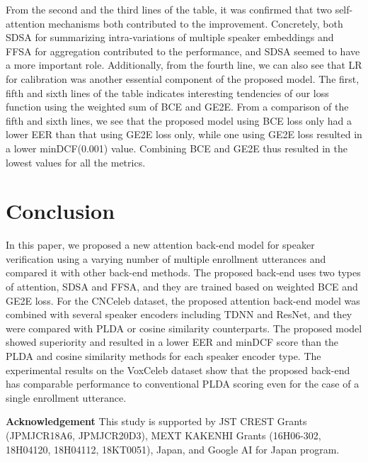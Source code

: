 \documentclass{article}
\begin{document}
From the second and the third lines of the table, it was confirmed that two self-attention mechanisms both contributed to the improvement. Concretely, both SDSA for summarizing intra-variations of multiple speaker embeddings and FFSA for aggregation contributed to the performance, and SDSA seemed to have a more important role. Additionally, from the fourth line, we can also see that LR for calibration was another essential component of the proposed model. 
The first, fifth and sixth lines of the table indicates interesting tendencies of our loss function using the weighted sum of BCE and GE2E. From a comparison of the fifth and sixth lines, we see that the proposed model using BCE loss only had a lower EER than that using GE2E loss only, while one using GE2E loss resulted in a lower minDCF(0.001) value. Combining BCE and GE2E thus resulted in the lowest values for all the metrics. 
\vspace{-1mm}

\section{Conclusion}
\vspace{-1mm}
\label{sec:majhead}

In this paper, we proposed a new attention back-end model for speaker verification using a varying number of multiple enrollment utterances and compared it with other back-end methods. The proposed back-end uses two types of attention, SDSA and FFSA, and they are trained based on weighted BCE and GE2E loss. For the CNCeleb dataset, the proposed attention back-end model was combined with several speaker encoders including TDNN and ResNet, and they were compared with PLDA or cosine similarity counterparts. The proposed model showed superiority and resulted in a lower EER and minDCF score than the PLDA and cosine similarity methods for each speaker encoder type. 
The experimental results on the VoxCeleb dataset show that the proposed back-end has comparable performance to conventional PLDA scoring even for the case of a single enrollment utterance.

\vspace{1mm}
\noindent
\textbf{Acknowledgement}
This study is supported by JST CREST Grants (JPMJCR18A6, JPMJCR20D3), MEXT KAKENHI Grants (16H06-302, 18H04120, 18H04112, 18KT0051), Japan, and Google AI for Japan program.








\end{document}
